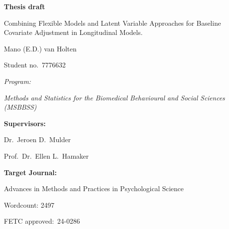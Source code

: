 \documentclass{article}
\begin{document}
	
	\begin{titlepage}
		\begin{doublespace}
			\centering
			
			\vspace*{3cm}
			{\huge \textbf{Thesis draft}\par}
			\vspace{1cm}
			
			{\Large Combining Flexible Models and Latent Variable Approaches for Baseline Covariate Adjustment in Longitudinal Models.}
			\vspace{2cm}
			
			{\large Mano (E.D.) van Holten\par}
			{\large Student no.\ 7776632\par}
			\vspace{1cm}
			
			{\large \textit{Program:}\par}
			{\large \textit{Methods and Statistics for the Biomedical Behavioural and Social Sciences (MSBBSS)}\par}
			\vspace{1cm}
			
			{\large \textbf{Supervisors:}\par}
			{\large Dr.\ Jeroen D.\ Mulder\par}
			{\large Prof.\ Dr.\ Ellen L.\ Hamaker\par}
			\vspace{1cm}
			
			{\large \textbf{Target Journal:}\par}
			{\large Advances in Methods and Practices in Psychological Science\par}
			\vspace{1cm}
			
			\vfill
			\begin{flushright}
				{\large Wordcount: 2497 \par}
				{\large FETC approved:\ 24-0286\par}
			\end{flushright}
		\end{doublespace}
	\end{titlepage}
	\restoregeometry
	
\end{document}
